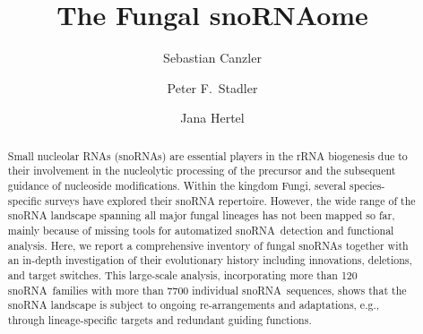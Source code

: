 \documentclass[preprint,3p,times,twocolumn]{elsarticle}
\newcommand{\sno}{snoRNA}
\begin{document}
\begin{frontmatter}

\title{The Fungal snoRNAome}

\author[LEI]{Sebastian Canzler}
\author[LEI,IZBI,MPI,IZI,RTH,TBI,SFI]{Peter F.\ Stadler}
\author[UFZ]{Jana Hertel}

\address[LEI]{Bioinformatics Group, Department of Computer Science,
  Leipzig University,
  H{\"a}rtelstra{\ss}e 16-18, D-04107 Leipzig, Germany
}
\address[IZBI]{Interdisciplinary Center for Bioinformatics,
  German Centre for Integrative Biodiversity Research (iDiv)
  Halle-Jena-Leipzig, Competence Center for Scalable Data Services
  and Solutions, and Leipzig Research Center for Civilization Diseases,
  Leipzig University
}
\address[UFZ]{Young Investigators Group Bioinformatics and Transcriptomics, 
  Department Proteomics, 
  Helmholtz Centre for Environmental Research -- UFZ, 
  Permoserstra{\ss}e 15,
  D-04318 Leipzig, Germany
}
\address[IZI]{Department of Diagnostics, 
  Fraunhofer Institute for Cell Therapy and Immunology -- IZI,
  Perlickstra{\ss}e 1, 
  D-04103 Leipzig, Germany
}
\address[MPI]{Max Planck Institute for Mathematics in the Sciences,
  Inselstra{\ss}e 22, D-04103 Leipzig, Germany
}
\address[TBI]{Department of Theoretical Chemistry,
  University of Vienna,
  W{\"a}hringerstra{\ss}e 17, A-1090 Wien, Austria
}
\address[RTH]{Center for non-coding RNA in Technology and Health,
  University of Copenhagen, Gr{\o}nneg{\aa}rdsvej 3, 
  DK-1870 Frederiksberg C, Denmark
}
\address[SFI]{Santa Fe Institute, 1399 Hyde Park Rd., Santa Fe, NM 87501,
  USA\\[1em]
}




\begin{abstract}
  Small nucleolar RNAs (snoRNAs) are essential players in the rRNA
  biogenesis due to their involvement in the nucleolytic processing of the
  precursor and the subsequent guidance of nucleoside modifications. Within
  the kingdom Fungi, several species-specific surveys have explored their
  snoRNA repertoire. However, the wide range of the snoRNA landscape
  spanning all major fungal lineages has not been mapped so far, mainly
  because of missing tools for automatized \sno\ detection and functional
  analysis. Here, we report a comprehensive inventory of fungal {\sno}s
  together with an in-depth investigation of their evolutionary history
  including innovations, deletions, and target switches. This large-scale
  analysis, incorporating more than 120 \sno\ families with more than 7700
  individual \sno\ sequences, shows that the {\sno} landscape is subject
  to ongoing re-arrangements and adaptations, e.g., through
  lineage-specific targets and redundant guiding functions.


\end{abstract}
\end{frontmatter}
\end{document}
